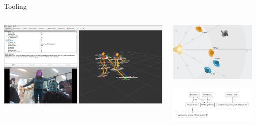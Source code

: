 \documentclass[xcolor=table,aspectratio=169]{beamer}
\begin{document}
\begin{frame}{Tooling}

    \begin{columns}
        \begin{column}{0.6\linewidth}
    \includegraphics[width=\linewidth]{ros4hri/screenshot.jpg}
        \end{column}
        \begin{column}{0.4\linewidth}
    \includegraphics[width=0.95\linewidth]{ros4hri/rqt_humans.png}
            \vspace{1em}

    \includegraphics[width=6cm]{ros4hri/human_graph.png}
        \end{column}
    \end{columns}
\end{frame}
\end{document}
